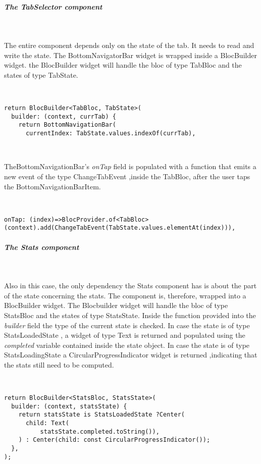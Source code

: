 \subparagraph{The TabSelector component}\mbox{}\\
\label{subpar:todo_app_bloc_core_state}

The entire component depends only on the state of the tab. It needs to read and write the state. The BottomNavigatorBar widget is wrapped inside a BlocBuilder widget. the BlocBuilder widget will handle the bloc of type TabBloc and the states of type TabState.
\begin{code}
\mbox{}\\
 \mbox{}
\label{code:2.14}
\begin{verbatim}
return BlocBuilder<TabBloc, TabState>(
  builder: (context, currTab) {
    return BottomNavigationBar(
      currentIndex: TabState.values.indexOf(currTab),
\end{verbatim}
\mbox{}\\
\end{code}
TheBottomNavigationBar’s \textit{onTap} field is populated with a function that emits a new event of the type ChangeTabEvent ,inside the TabBloc, after the user taps the BottomNavigationBarItem.
\begin{code}
\mbox{}\\
 \mbox{}
\label{code:2.14}
\begin{verbatim}
onTap: (index)=>BlocProvider.of<TabBloc>(context).add(ChangeTabEvent(TabState.values.elementAt(index))),
\end{verbatim}
\mbox{}
\end{code}


\subparagraph{The Stats component}\mbox{}\\
\label{subpar:todo_app_bloc_core_state}

Also in this case, the only dependency the Stats component has is about the part of the state concerning the stats. The component is, therefore, wrapped into a BlocBuilder widget. The Blocbuilder widget will handle the bloc of type StatsBloc and the states of type StatsState. Inside the function provided into the \textit{builder} field the type of the current state is checked. In case the state is of type StatsLoadedState , a widget of type Text is returned and populated using the \textit{completed} variable contained inside the state object. In case the state is of type StatsLoadingState a CircularProgressIndicator widget is returned ,indicating that the stats still need to be computed.
\begin{code}
\mbox{}\\
 \mbox{}
\label{code:2.14}
\begin{verbatim}
return BlocBuilder<StatsBloc, StatsState>(
  builder: (context, statsState) {
    return statsState is StatsLoadedState ?Center(
      child: Text(
          statsState.completed.toString()),
    ) : Center(child: const CircularProgressIndicator());
  },
);
\end{verbatim}
\mbox{}
\end{code}


